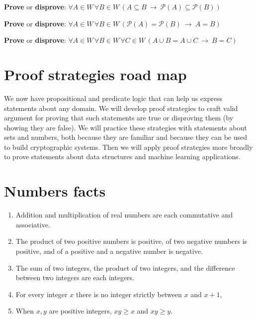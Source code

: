 \documentclass[12pt, oneside]{article}
\begin{document}
{\bf Prove} or {\bf  disprove}:  $\forall  A \in W\,  \forall B \in W\,  \left( A \subseteq B
~\to ~ \mathcal{P}(A) \subseteq \mathcal{P}(B) \right)$

\vfill
\vfill
\vfill

{\bf Prove} or {\bf  disprove}:  $\forall  A \in W\,  \forall B \in W\,  \left( \mathcal{P}(A)  =\mathcal{P}(B)
~\to ~ A = B \right)$

\vfill
\vfill

{\bf Prove} or {\bf  disprove}:  $\forall  A \in W\,  \forall B \in W\, \forall C  \in W\,  \left( A\cup B  = A \cup  C
~\to ~ B = C \right)$

\vfill
\vfill \vfill
\section*{Proof strategies road map}


We now have propositional and predicate logic that can help us express 
statements about any domain. We will develop proof strategies to 
craft valid argument for proving that such statements are true or disproving
them (by showing they are false). We will practice these strategies with 
statements about sets and numbers, both because they are familiar and because they
can be used to build cryptographic systems. Then we will apply proof strategies
more broadly to prove statements about data structures and machine learning 
applications. \vfill
\section*{Numbers facts}


\begin{enumerate}
    \item Addition and multiplication of real 
    numbers are each commutative and associative. 
    \vspace{25pt}
    \item The product of two positive numbers is positive, of 
    two negative numbers is positive, and of a positive and a negative number is negative.
    \vspace{25pt}
    \item The sum of two integers, the product of two integers, and the 
    difference between two integers are each integers.
    \vspace{25pt}
    \item For every integer $x$ there is no integer strictly between $x$ and $x+1$, 
    \vspace{25pt}
    \item When $x, y$ are positive integers, $xy \geq x$ and $xy \geq y$.
    \vspace{25pt}
\end{enumerate}
 \vfill
\end{document}
